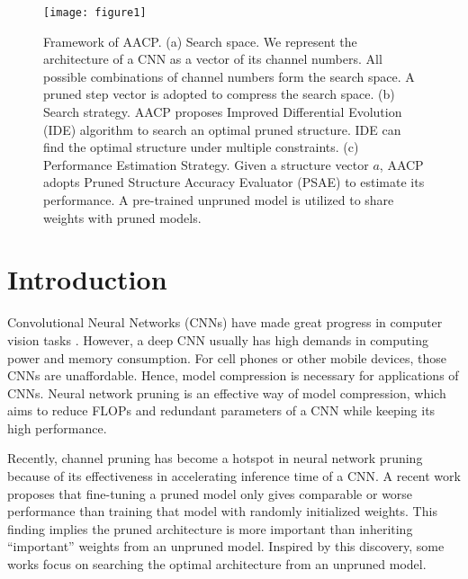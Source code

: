 \documentclass[final]{cvpr}
\begin{document}
\begin{figure}[t]
   \centering
   \texttt{[image: figure1]} %
   \caption{
       Framework of AACP. (a) Search space. We represent the architecture of a CNN as a vector of its channel numbers. 
       All possible combinations of channel numbers form the search space. A pruned step vector is adopted to compress the search space.
       (b) Search strategy. AACP proposes Improved Differential Evolution (IDE) algorithm to search an optimal pruned structure. IDE can find the optimal structure under 
       multiple constraints. (c) Performance Estimation Strategy. Given a structure vector $a$, AACP adopts Pruned Structure Accuracy Evaluator (PSAE) to estimate its performance.
       A pre-trained unpruned model is utilized to share weights with pruned models.
   }
   \label{fig1}
\end{figure}

\section{Introduction}
Convolutional Neural Networks (CNNs) have made great progress in computer vision tasks
\cite{he2016deep,long2015fully,ren2015faster,chen2017deeplab}. However, a deep CNN
usually has high demands in computing power and memory consumption. For cell phones or other mobile devices, 
those CNNs are unaffordable. Hence, model compression \cite{lecun1990optimal,han2015deep,hinton2015distilling} is necessary
for applications of CNNs. Neural network pruning \cite{han2015deep,li2016pruning} is an effective way of model compression, which aims to reduce
FLOPs and redundant parameters of a CNN while keeping its high performance.

Recently, channel pruning has become a hotspot in neural network pruning because of its effectiveness in accelerating inference time of a CNN. 
A recent work \cite{liu2018rethinking} proposes that fine-tuning 
a pruned model only gives comparable or worse performance than training that model with randomly initialized weights. This finding 
implies the pruned architecture is more important than inheriting “important”  weights from an unpruned model. Inspired by this 
discovery, some works \cite{guo2020dmcp,yu2019autoslim,lin2020channel,liu2019metapruning} focus on searching the optimal 
architecture from an unpruned model.
\end{document}
